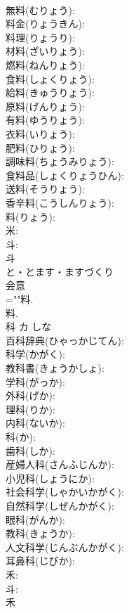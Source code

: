 \documentclass[8pt]{extreport}
\begin{document}
\begin{CJK}{UTF8}{min}
\\	無料(むりょう): 
\\	料金(りょうきん): 
\\	料理(りょうり): 
\\	材料(ざいりょう): 
\\	燃料(ねんりょう): 
\\	食料(しょくりょう): 
\\	給料(きゅうりょう): 
\\	原料(げんりょう): 
\\	有料(ゆうりょう): 
\\	衣料(いりょう): 
\\	肥料(ひりょう): 
\\	調味料(ちょうみりょう): 
\\	食料品(しょくりょうひん): 
\\	送料(そうりょう): 
\\	香辛料(こうしんりょう): 
\\	料(りょう): 
\\	米: 
\\	斗: 
\\	斗	
\\	と・とます・ますづくり	
\\	会意 
\\	=""料.
\\	料.
\\	科	カ		しな	
\\	百科辞典(ひゃっかじてん): 
\\	科学(かがく): 
\\	教科書(きょうかしょ): 
\\	学科(がっか): 
\\	外科(げか): 
\\	理科(りか): 
\\	内科(ないか): 
\\	科(か): 
\\	歯科(しか): 
\\	産婦人科(さんふじんか): 
\\	小児科(しょうにか): 
\\	社会科学(しゃかいかがく): 
\\	自然科学(しぜんかがく): 
\\	眼科(がんか): 
\\	教科(きょうか): 
\\	人文科学(じんぶんかがく): 
\\	耳鼻科(じびか): 
\\	禾: 
\\	斗: 
\\	禾	

\end{CJK}
\end{document}
